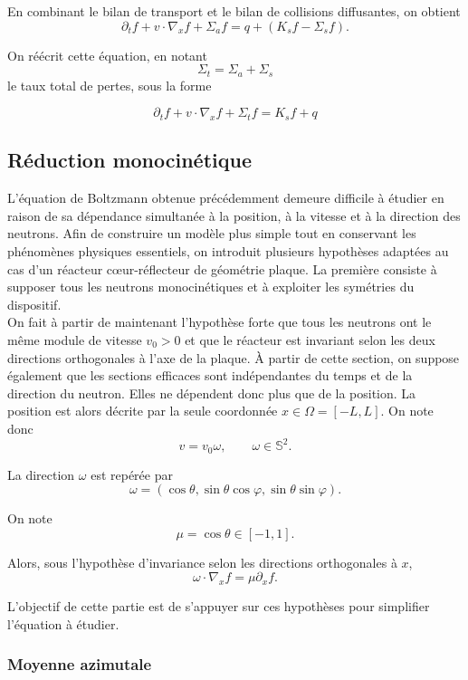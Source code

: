 \documentclass{article}
\begin{document}
En combinant le bilan de transport et le bilan de collisions diffusantes, on obtient
\[
\partial_t f + v\cdot\nabla_x f+\Sigma_af = q +(K_sf-\Sigma_sf).
\]

On réécrit cette équation, en notant
\[
\Sigma_t =\Sigma_a +\Sigma_s
\]
le taux total de pertes, sous la forme

\begin{equation}
    \boxed{\partial_t f+v\cdot\nabla_x f+\Sigma_tf = K_sf + q}
    \label{Equation de Boltzmann}
\end{equation}


\subsection{Réduction monocinétique}
L'équation de Boltzmann obtenue précédemment demeure difficile à étudier en raison de sa dépendance simultanée à la position, à la vitesse et à la direction des neutrons. Afin de construire un modèle plus simple tout en conservant les phénomènes physiques essentiels, on introduit plusieurs hypothèses adaptées au cas d'un réacteur cœur-réflecteur de géométrie plaque. La première consiste à supposer tous les neutrons monocinétiques et à exploiter les symétries du dispositif.\\
On fait à partir de maintenant l'hypothèse forte que tous les neutrons ont le même module de vitesse $v_0>0$ et que le réacteur est invariant selon les deux directions orthogonales à l'axe de la plaque.
À partir de cette section, on suppose également que les sections efficaces sont indépendantes du temps et de la direction du neutron. Elles ne dépendent donc plus que de la position.
La position est alors décrite par la seule coordonnée $x\in\Omega=[-L,L]$. On note donc
\[
v=v_0\omega, \qquad \omega\in\mathbb{S}^2.
\]

La direction $\omega$ est repérée par
\[
\omega=(\cos\theta,\sin\theta\cos\varphi,\sin\theta\sin\varphi).
\]

On note
\[ \mu=\cos\theta\in[-1,1]. \]

Alors, sous l’hypothèse d’invariance selon les directions orthogonales à $x$,
\[ \omega\cdot\nabla_x f = \mu\partial_x f. \]

L’objectif de cette partie est de s’appuyer sur ces hypothèses pour simplifier l’équation à étudier.

\subsubsection{Moyenne azimutale}
\end{document}
